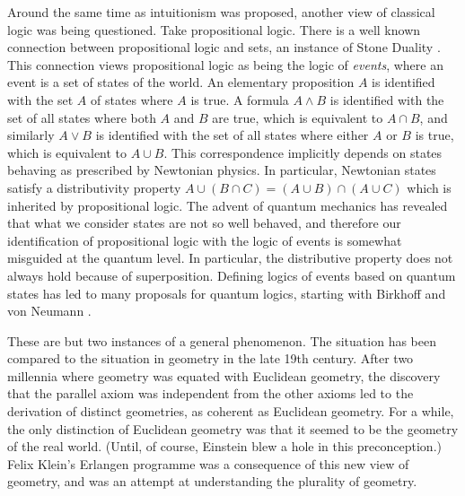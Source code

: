 \documentclass[11pt]{article}
\newcommand{\<}{\langle}
\renewcommand{\>}{\rangle}
\begin{document}
Around the same time as intuitionism was proposed, another view of
classical logic was being questioned. 
Take propositional  logic.
There is a well known connection between propositional logic and
sets, an instance of Stone Duality \cite{r:stone36,r:johnstone82}. 
This connection views  propositional logic as
being the logic of \emph{events}, where an event is a set of states of
the world. 
An elementary proposition $A$ is identified with the set $A$ of states
where $A$ is true. 
A formula $A\land B$ is identified with the set of all states where
both $A$ and $B$ are true, which is equivalent to $A\cap B$, and
similarly $A\lor B$ is identified with the set of all states where
either $A$ or $B$ is true, which is equivalent to $A\cup B$. 
This correspondence implicitly depends on states behaving as
prescribed by Newtonian physics. 
In particular, Newtonian states satisfy a distributivity property
$A\cup(B\cap C) = (A\cup B)\cap (A\cup C)$
which is inherited by propositional logic. 
The advent of quantum mechanics has revealed that what we consider
states are not so well behaved, and therefore our identification of
propositional logic with the logic of events is somewhat misguided at the
quantum level. 
In particular, the distributive property does not always hold because
of superposition. 
Defining logics of events based on quantum states has led to many
proposals for quantum logics, starting with Birkhoff and von Neumann
\cite{r:birkhoff36}. 

These are but two instances of a general phenomenon. 
The situation has been compared to the situation in geometry
in the late 19th century. 
After two millennia where geometry was equated with Euclidean geometry,
the discovery that the parallel axiom was independent from the other
axioms led to the derivation of distinct geometries, as coherent as
Euclidean geometry. 
For a while, the only distinction of Euclidean geometry was that it
seemed to be the geometry of the real world. 
(Until, of course, Einstein blew a hole in this preconception.) 
Felix Klein's Erlangen programme was a consequence of this new view of
geometry, and was an attempt at understanding the plurality of
geometry.
\end{document}
